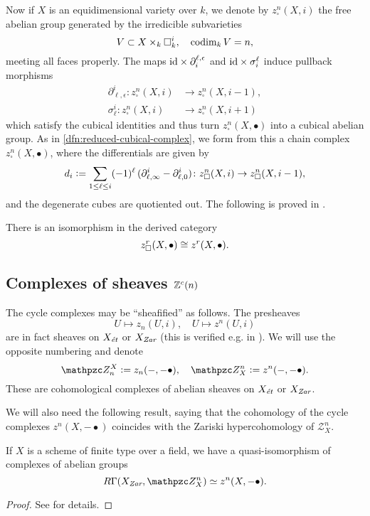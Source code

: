 Now if $X$ is an equidimensional variety over $k$, we denote by
$z^n_\square (X,i)$ the free abelian group generated by the irredicible
subvarieties
$$V \subset X\times_k \square^i_k, \quad \operatorname{codim}_k V = n,$$
meeting all faces properly. The maps $\mathrm{id}\times \partial_i^{\ell,\epsilon}$
and $\mathrm{id}\times \sigma_i^\ell$ induce pullback morphisms
\begin{align*}
  \partial^i_{\ell,\epsilon}\colon z^n_\square (X,i) & \to z^n_\square (X,i-1),\\
  \sigma^i_\ell\colon z^n_\square (X,i) & \to z^n_\square (X,i+1)
\end{align*}
which satisfy the cubical identities and thus turn $z^n_\square (X,\bullet)$
into a cubical abelian group. As in \ref{dfn:reduced-cubical-complex}, we form
from this a chain complex $z^n_\square (X,\bullet)$, where the differentials are
given by
\[ d_i \mathrel{\mathop:}= \sum_{1 \le \ell \le i} (-1)^\ell\,(\partial^i_{\ell,\infty} - \partial^i_{\ell,0})\colon
  z^n_\square (X,i) \to z^n_\square (X,i-1), \]
and the degenerate cubes are quotiented out. The following is proved in
\cite{Levine-Bloch-revisited}.

\begin{theorem}
  \label{thm:cubical-vs-simplicial-cycle-complexes}
  There is an isomorphism in the derived category
  $$z^r_\square (X,\bullet) \cong z^r (X,\bullet).$$
\end{theorem}

\subsection*{Complexes of sheaves $\mathbb{Z}^c (n)$}

The cycle complexes may be ``sheafified'' as follows. The presheaves
$$U \mapsto z_n (U, i), \quad U \mapsto z^n (U, i)$$
are in fact sheaves on $X_\text{\it ét}$ or $X_\text{\it Zar}$ (this is verified
e.g. in \cite[Lemma 3.1]{Geisser-04}). We will use the opposite numbering and
denote
\[ \mathcal{Z}_n^X \dfn z_n (-, -\bullet), \quad
  \mathcal{Z}^n_X \dfn z^n (-, -\bullet). \]
These are cohomological complexes of abelian sheaves on $X_\text{\it ét}$ or
$X_\text{\it Zar}$.

\vspace{1em}

We will also need the following result, saying that the cohomology of the cycle
complexes $z^n (X, -\bullet)$ coincides with the Zariski hypercohomology of
$\mathcal{Z}^n_X$.

\begin{theorem}
  \label{thm:cycle-cplxs-localization}
  If $X$ is a scheme of finite type over a field, we have a quasi-isomorphism of
  complexes of abelian groups
  $$R\Gamma (X_\text{\it Zar}, \mathcal{Z}^n_X) \quiso z^n (X, -\bullet).$$

  \begin{proof}
    See \cite[\S 1.2.4.]{Geisser-survey} for details.
  \end{proof}
\end{theorem}

